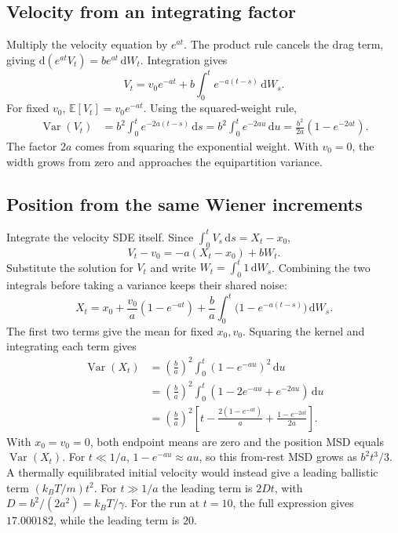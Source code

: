 \documentclass[11pt,a4paper]{article}
\newcommand{\E}{\mathbb E}
\newcommand{\Var}{\operatorname{Var}}
\newcommand{\dd}{\,\mathrm d}
\begin{document}
\subsection*{Velocity from an integrating factor}
Multiply the velocity equation by \(e^{at}\). The product rule cancels the
drag term, giving \(\mathrm d(e^{at}V_t)=be^{at}\dd W_t\).
Integration gives
\[
 V_t=v_0 e^{-at}+b\int_0^t e^{-a(t-s)}\dd W_s.
\]
For fixed \(v_0\), \(\E[V_t]=v_0e^{-at}\). Using the squared-weight rule,
\begin{align*}
 \Var(V_t)
 &= b^2\int_0^t e^{-2a(t-s)}\dd s
  = b^2\int_0^t e^{-2au}\dd u
  = \boxed{\frac{b^2}{2a}(1-e^{-2at})}.
\end{align*}
The factor \(2a\) comes from squaring the exponential weight. With \(v_0=0\),
the width grows from zero and approaches the equipartition variance.

\subsection*{Position from the same Wiener increments}
Integrate the velocity SDE itself. Since \(\int_0^t V_s\dd s=X_t-x_0\),
\[
 V_t-v_0=-a(X_t-x_0)+bW_t.
\]
Substitute the solution for \(V_t\) and write \(W_t=\int_0^t 1\dd W_s\).
Combining the two integrals before taking a variance keeps their shared noise:
\[
 X_t=x_0+\frac{v_0}{a}(1-e^{-at})
     +\frac ba\int_0^t\bigl(1-e^{-a(t-s)}\bigr)\dd W_s.
\]
The first two terms give the mean for fixed \(x_0,v_0\). Squaring the
kernel and integrating each term gives
\begin{align*}
 \Var(X_t)
 &=\left(\frac ba\right)^2\int_0^t(1-e^{-au})^2\dd u\\
 &=\left(\frac ba\right)^2\int_0^t(1-2e^{-au}+e^{-2au})\dd u\\
 &=\boxed{\left(\frac ba\right)^2
 \left[t-\frac{2(1-e^{-at})}{a}+\frac{1-e^{-2at}}{2a}\right]}.
\end{align*}
With \(x_0=v_0=0\), both endpoint means are zero and the position MSD equals
\(\Var(X_t)\). For \(t\ll 1/a\), \(1-e^{-au}\approx au\), so this
from-rest MSD grows as \(b^2t^3/3\). A thermally equilibrated initial velocity
would instead give a leading ballistic term \((k_BT/m)t^2\).
For \(t\gg1/a\) the leading term is \(2Dt\), with
\(D=b^2/(2a^2)=k_BT/\gamma\). For the run at \(t=10\), the full expression
gives \(17.000182\), while the leading term is \(20\).
\newpage
\end{document}
